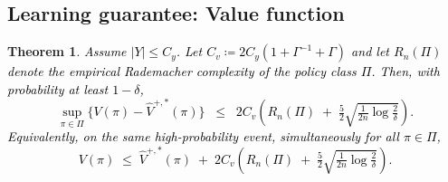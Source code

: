 \documentclass{article} %
\theoremstyle{plain}
\newtheorem{theorem}{Theorem}[section]
\theoremstyle{definition}
\theoremstyle{remark}
\newcommand{\rebuttal}[1]{\textcolor{black}{#1}}
\begin{document}
\subsection{Learning guarantee: Value function}\label{appendix:improvement_value}
\begin{theorem}%
\rebuttal{Assume $|Y|\le C_y$. Let $C_v \coloneqq 2C_y(1+\Gamma^{-1}+\Gamma)$ and let $R_n(\Pi)$ denote the empirical Rademacher complexity of the policy class $\Pi$. Then, with probability at least $1-\delta$,
\begin{equation}\label{eq:uniform_bound}
\sup_{\pi\in\Pi}\Big\{ V(\pi) - \hat V^{+,*}(\pi) \Big\}
\;\;\le\;\; 2C_v\!\left( R_n(\Pi) \;+\; \tfrac{5}{2}\sqrt{\tfrac{1}{2n}\log\!\tfrac{2}{\delta}} \right).
\end{equation}
Equivalently, on the same high-probability event, \emph{simultaneously for all} $\pi\in\Pi$,
\begin{equation}\label{eq:uniform_per_policy}
V(\pi)\;\le\; \hat V^{+,*}(\pi) \;+\; 2C_v\!\left( R_n(\Pi) \;+\; \tfrac{5}{2}\sqrt{\tfrac{1}{2n}\log\!\tfrac{2}{\delta}} \right).
\end{equation}}
\end{theorem}
\end{document}
